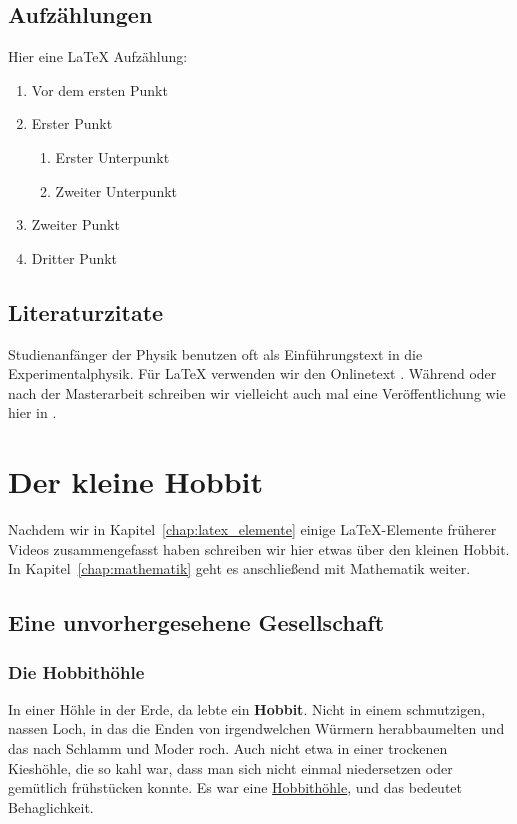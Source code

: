 \documentclass[12pt,a4paper,bibtotoc]{scrreprt}
\newcommand{\chapterref}[1]{Kapitel~\ref{#1}}
\begin{document}
\section{Aufzählungen}
%
Hier eine \LaTeX{} Aufzählung:
\begin{enumerate}
  \item Vor dem ersten Punkt
  \item Erster Punkt
  \begin{enumerate}
    \item Erster Unterpunkt
    \item Zweiter Unterpunkt
  \end{enumerate}
  \item Zweiter Punkt
  \item Dritter Punkt   
\end{enumerate}
%
\section{Literaturzitate}
\label{sec:literatur}
Studienanfänger der Physik benutzen oft \cite{gerthsen2013physik} als
Einführungstext in die Experimentalphysik. Für \LaTeX{} verwenden wir
den Onlinetext \cite{daniel2015l2kurz}. Während oder nach der
Masterarbeit schreiben wir vielleicht auch mal eine Veröffentlichung
wie hier in \cite{heymans2006shear}.
%
\chapter{Der kleine Hobbit}
\label{chap:hobbit}
%
Nachdem wir in \chapterref{chap:latex_elemente} einige \LaTeX{}-Elemente
früherer Videos zusammengefasst haben schreiben wir hier etwas über den
kleinen Hobbit. In \chapterref{chap:mathematik} geht es anschließend
mit Mathematik weiter.
\section{Eine unvorhergesehene Gesellschaft}

\subsection*{Die Hobbithöhle}
In einer Höhle in der Erde, da lebte ein \textbf{Hobbit}. Nicht in
einem schmutzigen, nassen Loch, in das die Enden von irgendwelchen
Würmern herabbaumelten und das nach Schlamm und Moder roch. Auch nicht
etwa in einer trockenen Kieshöhle, die so kahl war, dass man sich
nicht einmal niedersetzen oder gemütlich frühstücken konnte. Es war
eine \underline{Hobbithöhle}, und das bedeutet Behaglichkeit.
\end{document}
